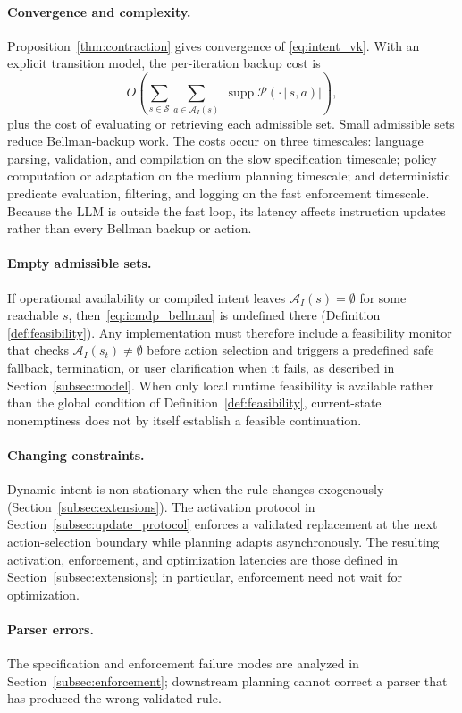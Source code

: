 \documentclass[journal]{IEEEtran}
\theoremstyle{definition}
\newcommand{\cS}{\mathcal{S}}
\newcommand{\cA}{\mathcal{A}}
\newcommand{\cP}{\mathcal{P}}
\newcommand{\given}{\,\vert\,}
\begin{document}
\paragraph{Convergence and complexity.}
Proposition~\ref{thm:contraction} gives convergence of
\eqref{eq:intent_vk}. With an
explicit transition model, the per-iteration backup cost is
\[
  O\!\left(\sum_{s\in\cS}\sum_{a\in\cA_I(s)}
  |\operatorname{supp}\cP(\cdot\given s,a)|\right),
\]
plus the cost of evaluating or retrieving each admissible set. Small admissible
sets reduce Bellman-backup work. The costs occur on three timescales: language
parsing, validation, and compilation on the slow specification timescale;
policy computation or adaptation on the medium planning timescale; and
deterministic predicate evaluation, filtering, and logging on the fast
enforcement timescale. Because the LLM is outside the fast loop, its latency
affects instruction updates rather than every Bellman backup or action.

\paragraph{Empty admissible sets.}
If operational availability or compiled intent leaves
$\cA_I(s) = \emptyset$ for some reachable
$s$, then~\eqref{eq:icmdp_bellman} is undefined there (Definition
\ref{def:feasibility}). Any implementation must therefore include a
feasibility monitor that checks $\cA_I(s_t) \neq \emptyset$ before action
selection and triggers a predefined safe fallback, termination, or user
clarification when it fails, as described in Section~\ref{subsec:model}.
When only local runtime feasibility is available rather than the global
condition of Definition~\ref{def:feasibility}, current-state nonemptiness does
not by itself establish a feasible continuation.

\paragraph{Changing constraints.}
Dynamic intent is non-stationary when the rule changes exogenously
(Section~\ref{subsec:extensions}). The activation protocol in
Section~\ref{subsec:update_protocol} enforces a validated replacement at the
next action-selection boundary while planning adapts asynchronously. The
resulting activation, enforcement, and optimization latencies are those defined
in Section~\ref{subsec:extensions}; in particular, enforcement need not wait
for optimization.

\paragraph{Parser errors.}
The specification and enforcement failure modes are analyzed in
Section~\ref{subsec:enforcement}; downstream planning cannot correct a parser
that has produced the wrong validated rule.
\end{document}
